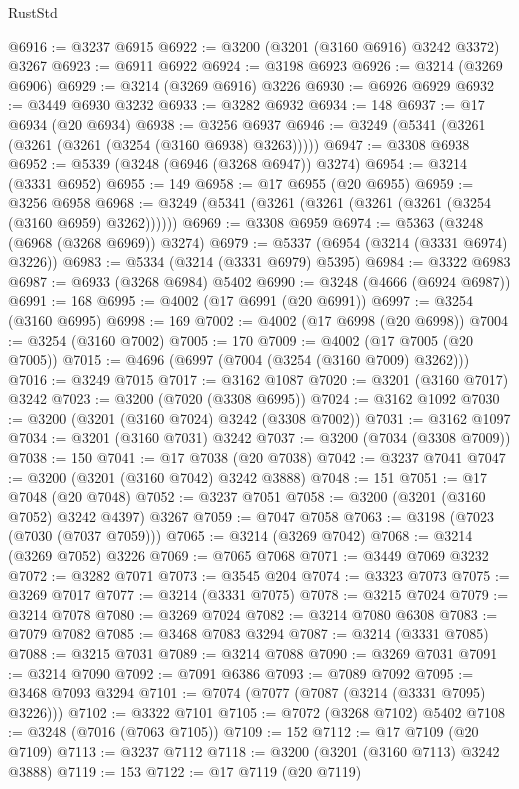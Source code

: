 \begin{lexlean}{RustStd}
\begin{coremodule}
@6916 := @3237 @6915
@6922 := @3200 (@3201 (@3160 @6916) @3242 @3372) @3267
@6923 := @6911 @6922
@6924 := @3198 @6923
@6926 := @3214 (@3269 @6906)
@6929 := @3214 (@3269 @6916) @3226
@6930 := @6926 @6929
@6932 := @3449 @6930 @3232
@6933 := @3282 @6932
@6934 := 148
@6937 := @17 @6934 (@20 @6934)
@6938 := @3256 @6937
@6946 := @3249 (@5341 (@3261 (@3261 (@3261 (@3254 (@3160 @6938) @3263)))))
@6947 := @3308 @6938
@6952 := @5339 (@3248 (@6946 (@3268 @6947)) @3274)
@6954 := @3214 (@3331 @6952)
@6955 := 149
@6958 := @17 @6955 (@20 @6955)
@6959 := @3256 @6958
@6968 := @3249 (@5341 (@3261 (@3261 (@3261 (@3261 (@3254 (@3160 @6959) @3262))))))
@6969 := @3308 @6959
@6974 := @5363 (@3248 (@6968 (@3268 @6969)) @3274)
@6979 := @5337 (@6954 (@3214 (@3331 @6974) @3226))
@6983 := @5334 (@3214 (@3331 @6979) @5395)
@6984 := @3322 @6983
@6987 := @6933 (@3268 @6984) @5402
@6990 := @3248 (@4666 (@6924 @6987))
@6991 := 168
@6995 := @4002 (@17 @6991 (@20 @6991))
@6997 := @3254 (@3160 @6995)
@6998 := 169
@7002 := @4002 (@17 @6998 (@20 @6998))
@7004 := @3254 (@3160 @7002)
@7005 := 170
@7009 := @4002 (@17 @7005 (@20 @7005))
@7015 := @4696 (@6997 (@7004 (@3254 (@3160 @7009) @3262)))
@7016 := @3249 @7015
@7017 := @3162 @1087
@7020 := @3201 (@3160 @7017) @3242
@7023 := @3200 (@7020 (@3308 @6995))
@7024 := @3162 @1092
@7030 := @3200 (@3201 (@3160 @7024) @3242 (@3308 @7002))
@7031 := @3162 @1097
@7034 := @3201 (@3160 @7031) @3242
@7037 := @3200 (@7034 (@3308 @7009))
@7038 := 150
@7041 := @17 @7038 (@20 @7038)
@7042 := @3237 @7041
@7047 := @3200 (@3201 (@3160 @7042) @3242 @3888)
@7048 := 151
@7051 := @17 @7048 (@20 @7048)
@7052 := @3237 @7051
@7058 := @3200 (@3201 (@3160 @7052) @3242 @4397) @3267
@7059 := @7047 @7058
@7063 := @3198 (@7023 (@7030 (@7037 @7059)))
@7065 := @3214 (@3269 @7042)
@7068 := @3214 (@3269 @7052) @3226
@7069 := @7065 @7068
@7071 := @3449 @7069 @3232
@7072 := @3282 @7071
@7073 := @3545 @204
@7074 := @3323 @7073
@7075 := @3269 @7017
@7077 := @3214 (@3331 @7075)
@7078 := @3215 @7024
@7079 := @3214 @7078
@7080 := @3269 @7024
@7082 := @3214 @7080 @6308
@7083 := @7079 @7082
@7085 := @3468 @7083 @3294
@7087 := @3214 (@3331 @7085)
@7088 := @3215 @7031
@7089 := @3214 @7088
@7090 := @3269 @7031
@7091 := @3214 @7090
@7092 := @7091 @6386
@7093 := @7089 @7092
@7095 := @3468 @7093 @3294
@7101 := @7074 (@7077 (@7087 (@3214 (@3331 @7095) @3226)))
@7102 := @3322 @7101
@7105 := @7072 (@3268 @7102) @5402
@7108 := @3248 (@7016 (@7063 @7105))
@7109 := 152
@7112 := @17 @7109 (@20 @7109)
@7113 := @3237 @7112
@7118 := @3200 (@3201 (@3160 @7113) @3242 @3888)
@7119 := 153
@7122 := @17 @7119 (@20 @7119)

\end{coremodule}
\end{lexlean}
